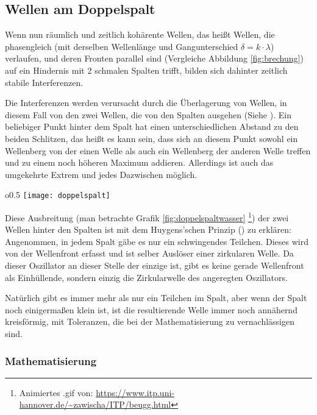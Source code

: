 \subsection{Wellen am Doppelspalt} \label{subsec:doppelspalt}

Wenn nun räumlich und zeitlich kohärente Wellen, das heißt Wellen, die phasengleich (mit derselben Wellenlänge und Gangunterschied $\delta= k \cdot \lambda$) verlaufen, und deren Fronten parallel sind (Vergleiche Abbildung \ref{fig:brechung}) auf ein Hindernis mit 2 schmalen Spalten trifft, bilden sich dahinter zeitlich stabile Interferenzen.

Die Interferenzen werden verursacht durch die Überlagerung von Wellen, in diesem Fall von den zwei Wellen, die von den Spalten ausgehen (Siehe ). Ein beliebiger Punkt hinter dem Spalt hat einen unterschiedlichen Abstand zu den beiden Schlitzen, das heißt es kann sein, dass sich an diesem Punkt sowohl ein Wellenberg von der einen Welle als auch ein Wellenberg der anderen Welle treffen und zu einem noch höheren Maximum addieren. Allerdings ist auch das umgekehrte Extrem und jedes Dazwischen möglich.

\begin{wrapfigure}{o}{0.5\textwidth}
	\center
	\texttt{[image: doppelspalt]}
	\caption{Kohärente Welle am Doppelspalt, man kann sie sich als Wasserwellen vorstellen.}
	\label{fig:doppelspaltwasser}
\end{wrapfigure}

Diese Ausbreitung (man betrachte Grafik \ref{fig:doppelspaltwasser} \footnote{Animiertes .gif von: \url{https://www.itp.uni-hannover.de/~zawischa/ITP/beugg.html}}) der zwei Wellen hinter den Spalten ist mit dem Huygens'schen Prinzip () zu erklären: Angenommen, in jedem Spalt gäbe es nur ein schwingendes Teilchen. Dieses wird von der Wellenfront erfasst und ist selber Auslöser einer zirkularen Welle. Da dieser Oszillator an dieser Stelle der einzige ist, gibt es keine gerade Wellenfront als Einhüllende, sondern einzig die Zirkularwelle des angeregten Oszillators.

Natürlich gibt es immer mehr als nur ein Teilchen im Spalt, aber wenn der Spalt noch einigermaßen klein ist, ist die resultierende Welle immer noch annähernd kreisförmig, mit Toleranzen, die bei der Mathematisierung zu vernachlässigen sind.


\subsubsection{Mathematisierung}

